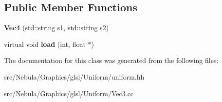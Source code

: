 \subsection*{\-Public \-Member \-Functions}
\begin{DoxyCompactItemize}
\item 
\hypertarget{classNeb_1_1glsl_1_1Uniform_1_1Vector_1_1Vec4_a507acc5ac257f999383cfa4a8622a34c}{{\bfseries \-Vec4} (std\-::string s1, std\-::string s2)}\label{classNeb_1_1glsl_1_1Uniform_1_1Vector_1_1Vec4_a507acc5ac257f999383cfa4a8622a34c}

\item 
\hypertarget{classNeb_1_1glsl_1_1Uniform_1_1Vector_1_1Vec4_a57629c898603f94ff642248f0e2ebc71}{virtual void {\bfseries load} (int, float $\ast$)}\label{classNeb_1_1glsl_1_1Uniform_1_1Vector_1_1Vec4_a57629c898603f94ff642248f0e2ebc71}

\end{DoxyCompactItemize}


\-The documentation for this class was generated from the following files\-:\begin{DoxyCompactItemize}
\item 
src/\-Nebula/\-Graphics/glsl/\-Uniform/uniform.\-hh\item 
src/\-Nebula/\-Graphics/glsl/\-Uniform/\-Vec3.\-cc\end{DoxyCompactItemize}
